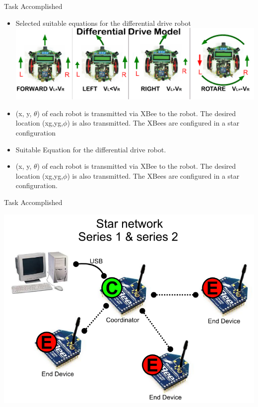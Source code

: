 \documentclass[11pt, a4paper]{beamer}
\begin{document}
\begin{frame}{Task Accomplished}
	\begin{itemize}

		\item Selected suitable equations for the differential drive robot\\
		\includegraphics[scale =.4]{images/ddrive.jpg}
		\item (x, y, $\theta$) of each robot is transmitted via XBee to the robot. The desired location (xg,yg,$\phi$) is also transmitted. The XBees are configured in a star configuration
		\item Suitable Equation for the differential drive robot. \\
		\item (x, y, $\theta$) of each robot is transmitted via XBee to the robot. The desired location (xg,yg,$\phi$) is also transmitted. The XBees are configured in a star configuration. 
	\end{itemize}		
\end{frame}

\begin{frame}{Task Accomplished}
		   \begin{center}
			\includegraphics[scale =.35]{images/star.png}
			\end{center}
\end{frame}
\end{document}
